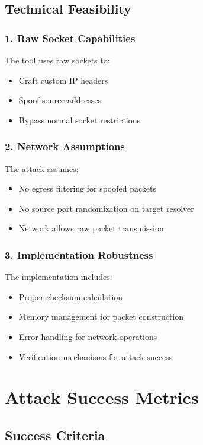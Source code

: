 \documentclass[12pt,a4paper]{article}
\begin{document}
\subsection{Technical Feasibility}

\subsubsection{1. Raw Socket Capabilities}

The tool uses raw sockets to:
\begin{itemize}
    \item Craft custom IP headers
    \item Spoof source addresses
    \item Bypass normal socket restrictions
\end{itemize}

\subsubsection{2. Network Assumptions}

The attack assumes:
\begin{itemize}
    \item No egress filtering for spoofed packets
    \item No source port randomization on target resolver
    \item Network allows raw packet transmission
\end{itemize}

\subsubsection{3. Implementation Robustness}

The implementation includes:
\begin{itemize}
    \item Proper checksum calculation
    \item Memory management for packet construction
    \item Error handling for network operations
    \item Verification mechanisms for attack success
\end{itemize}

\section{Attack Success Metrics}

\subsection{Success Criteria}
\end{document}
